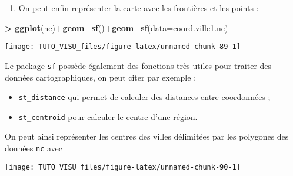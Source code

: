 \documentclass[]{book}
\newenvironment{Shaded}{\begin{snugshade}}{\end{snugshade}}
\newcommand{\DataTypeTok}[1]{\textcolor[rgb]{0.13,0.29,0.53}{#1}}
\newcommand{\KeywordTok}[1]{\textcolor[rgb]{0.13,0.29,0.53}{\textbf{#1}}}
\newcommand{\NormalTok}[1]{#1}
\newcommand{\OperatorTok}[1]{\textcolor[rgb]{0.81,0.36,0.00}{\textbf{#1}}}
\newcommand{\StringTok}[1]{\textcolor[rgb]{0.31,0.60,0.02}{#1}}
\providecommand{\tightlist}{%
  \setlength{\itemsep}{0pt}\setlength{\parskip}{0pt}}
\theoremstyle{definition}
\theoremstyle{definition}
\theoremstyle{definition}
\theoremstyle{remark}
\begin{document}
\begin{enumerate}
\def\labelenumi{\arabic{enumi}.}
\setcounter{enumi}{3}
\tightlist
\item
  On peut enfin représenter la carte avec les frontières et les points :
\end{enumerate}

\begin{Shaded}
\begin{Highlighting}[]
\OperatorTok{>}\StringTok{ }\KeywordTok{ggplot}\NormalTok{(nc)}\OperatorTok{+}\KeywordTok{geom_sf}\NormalTok{()}\OperatorTok{+}\KeywordTok{geom_sf}\NormalTok{(}\DataTypeTok{data=}\NormalTok{coord.ville1.nc)}
\end{Highlighting}
\end{Shaded}

\begin{center}\texttt{[image: TUTO\_VISU\_files/figure-latex/unnamed-chunk-89-1]} \end{center}

Le package \texttt{sf} possède également des fonctions très utiles pour traiter des données cartographiques, on peut citer par exemple :

\begin{itemize}
\tightlist
\item
  \texttt{st\_distance} qui permet de calculer des distances entre coordonnées ;
\item
  \texttt{st\_centroid} pour calculer le centre d'une région.
\end{itemize}

On peut ainsi représenter les centres des villes délimitées par les polygones des données \texttt{nc} avec

\begin{Shaded}
\end{Shaded}

\begin{center}\texttt{[image: TUTO\_VISU\_files/figure-latex/unnamed-chunk-90-1]} \end{center}
\end{document}

